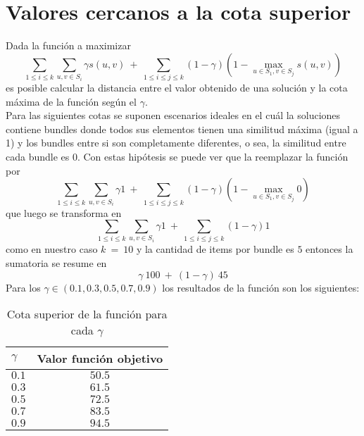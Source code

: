 \section{Valores cercanos a la cota superior}\label{conc:valoresOptimos}
Dada la función a maximizar $$\displaystyle\sum_{1 \leq i \leq k} \displaystyle\sum_{u,v \in S_{i}} \gamma s(u,v)\ +\ \displaystyle\sum_{1 \leq i \leq j \leq k} (1-\gamma) (1 - \displaystyle\max_{u \in S_{1}, v \in S_{j}} s(u,v))$$ es posible calcular la distancia entre el valor obtenido de una solución y la cota máxima de la función según el $\gamma$.\\
Para las siguientes cotas se suponen escenarios ideales en el cuál la soluciones contiene bundles donde todos sus elementos tienen una similitud máxima (igual a 1) y los bundles entre si son completamente diferentes, o sea, la similitud entre cada bundle es 0. Con estas hipótesis se puede ver que la reemplazar la función por $$\displaystyle\sum_{1 \leq i \leq k} \displaystyle\sum_{u,v \in S_{i}} \gamma 1\ +\ \displaystyle\sum_{1 \leq i \leq j \leq k} (1-\gamma) (1 - \displaystyle\max_{u \in S_{1}, v \in S_{j}} 0)$$ que luego se transforma en $$\displaystyle\sum_{1 \leq i \leq k} \displaystyle\sum_{u,v \in S_{i}} \gamma 1\ +\ \displaystyle\sum_{1 \leq i \leq j \leq k} (1-\gamma) 1$$ como en nuestro caso $k\ =\ 10$ y la cantidad de items por bundle es $5$ entonces la sumatoria se resume en $$\displaystyle\gamma\ 100\ +\ (1-\gamma)\ 45$$
Para los $\gamma \in (0.1, 0.3, 0.5, 0.7, 0.9)$ los resultados de la función son los siguientes:\\
\begin{table}[H]
  \centering
  \resizebox{0.5\textwidth}{!} {
    \begin{tabular}{|lc|}
    \hline
    $\gamma$ & Valor función objetivo \\
    \hline
    $0.1$  & $50.5$ \\
    $0.3$  & $61.5$ \\
    $0.5$  & $72.5$ \\
    $0.7$  & $83.5$ \\
    $0.9$  & $94.5$ \\
    \hline
    \end{tabular}
  }
    \caption {Cota superior de la función para cada $\gamma$}
\end{table}
